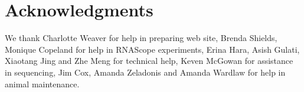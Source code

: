 \section{Acknowledgments}
We thank Charlotte Weaver for help in preparing web site, Brenda Shields, Monique Copeland for help in RNAScope experiments, Erina Hara, Asish Gulati, Xiaotang Jing and Zhe Meng for technical help, Keven McGowan for assistance in sequencing, Jim Cox, Amanda Zeladonis and Amanda Wardlaw for help in animal maintenance. 